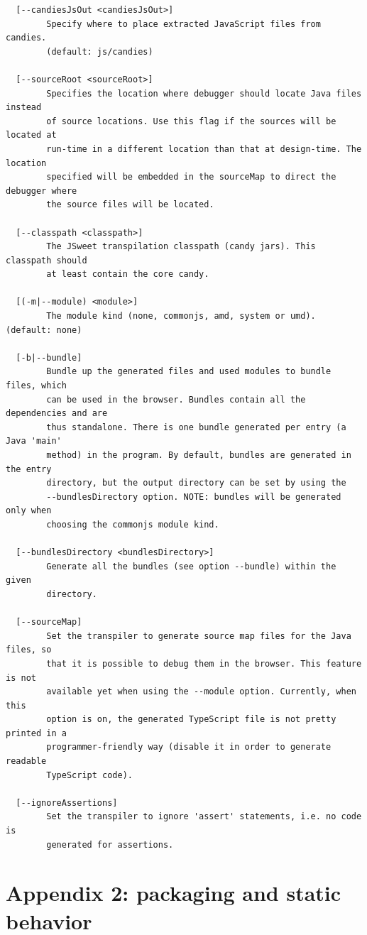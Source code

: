 \documentclass[a4paper]{report}
\begin{document}
\begin{small}
\begin{verbatim}
  [--candiesJsOut <candiesJsOut>]
        Specify where to place extracted JavaScript files from candies.
        (default: js/candies)

  [--sourceRoot <sourceRoot>]
        Specifies the location where debugger should locate Java files instead
        of source locations. Use this flag if the sources will be located at
        run-time in a different location than that at design-time. The location
        specified will be embedded in the sourceMap to direct the debugger where
        the source files will be located.

  [--classpath <classpath>]
        The JSweet transpilation classpath (candy jars). This classpath should
        at least contain the core candy.

  [(-m|--module) <module>]
        The module kind (none, commonjs, amd, system or umd). (default: none)

  [-b|--bundle]
        Bundle up the generated files and used modules to bundle files, which
        can be used in the browser. Bundles contain all the dependencies and are
        thus standalone. There is one bundle generated per entry (a Java 'main'
        method) in the program. By default, bundles are generated in the entry
        directory, but the output directory can be set by using the
        --bundlesDirectory option. NOTE: bundles will be generated only when
        choosing the commonjs module kind.

  [--bundlesDirectory <bundlesDirectory>]
        Generate all the bundles (see option --bundle) within the given
        directory.

  [--sourceMap]
        Set the transpiler to generate source map files for the Java files, so
        that it is possible to debug them in the browser. This feature is not
        available yet when using the --module option. Currently, when this
        option is on, the generated TypeScript file is not pretty printed in a
        programmer-friendly way (disable it in order to generate readable
        TypeScript code).

  [--ignoreAssertions]
        Set the transpiler to ignore 'assert' statements, i.e. no code is
        generated for assertions.
\end{verbatim}
\end{small}
       
\chapter*{Appendix 2: packaging and static behavior}
\end{document}
